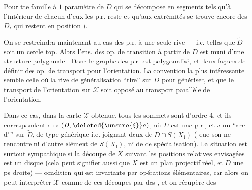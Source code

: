 Pour tte famille à $1$ paramètre de $D$
qui se décompose en segments
tels qu'à l'intérieur de chacun
d'eux les p.r. reste  et
 qu'aux extrémités se
trouve encore des $D_t$ qui restent
en position ).

On se restreindra maintenant au
cas des p.r. à une seule rive ---
i.e. telles que $\widetilde D$ soit un cercle top.
Alors l'ens. des op. de transition à
partir de $D$ est muni d'une
structure polygonale . Donc le graphe 
des p.r. est polygonalisé, et  
deux façons de définir des op. de
transport pour l'orientation. La convention
la plus intéressante semble celle où la
rive de généralisation ``tire'' sur $D$ pour génériser,
et que le transport de l'orientation sur
$\mathcal X$ soit opposé au transport parallèle de
l'orientation.

Dans ce cas, dans la carte $\mathcal X$ obtenue,
tous les sommets sont d'ordre
$4$, et ils correspondent   aux
 $(D,\deleted{\unsure{\xi}}a)$, où $D$ est
une p.r., et $a$ un ``arc d'''
sur $\widetilde D$, de type générique i.e.
joignant deux   de $D\cap S(X_1)$
( que son  ne rencontre
ni d'autre élément de $S(X_1)$, ni de 
de spécialisation).
La situation est surtout sympathique
si la découpe de $X$ suivant les
positions relatives envisagées est un
disque (cela peut signifier aussi
que $X$ est un plan projectif
réel, et $D$ une ps droite) ---
condition qui est invariante par
opérations élémentaires, car
alors on peut interpréter $\mathcal X$ comme
 de ces découpes par des
, et on récupère des
